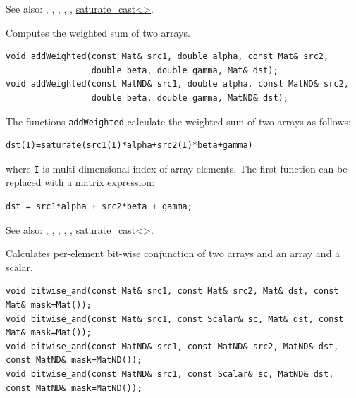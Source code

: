 See also: , , , ,
, \href{saturate}{saturate\_cast<>}.

\label{addWeighted}
Computes the weighted sum of two arrays.

\begin{lstlisting}
void addWeighted(const Mat& src1, double alpha, const Mat& src2,
                 double beta, double gamma, Mat& dst);
void addWeighted(const MatND& src1, double alpha, const MatND& src2,
                 double beta, double gamma, MatND& dst);
\end{lstlisting}
\begin{description}
\end{description}

The functions \texttt{addWeighted} calculate the weighted sum of two arrays as follows:

\begin{lstlisting}
dst(I)=saturate(src1(I)*alpha+src2(I)*beta+gamma)
\end{lstlisting}

where \texttt{I} is multi-dimensional index of array elements.
The first function can be replaced with a matrix expression:
\begin{lstlisting}
dst = src1*alpha + src2*beta + gamma;
\end{lstlisting}

See also: , , , ,
, \href{saturate}{saturate\_cast<>}.

\label{bitwise and}
Calculates per-element bit-wise conjunction of two arrays and an array and a scalar.

\begin{lstlisting}
void bitwise_and(const Mat& src1, const Mat& src2, Mat& dst, const Mat& mask=Mat());
void bitwise_and(const Mat& src1, const Scalar& sc, Mat& dst, const Mat& mask=Mat());
void bitwise_and(const MatND& src1, const MatND& src2, MatND& dst, const MatND& mask=MatND());
void bitwise_and(const MatND& src1, const Scalar& sc, MatND& dst, const MatND& mask=MatND());
\end{lstlisting}
\begin{description}
\end{description}


